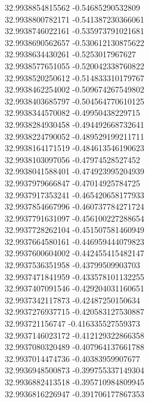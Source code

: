 {32.9938854815562	-0.54685290532809\\
32.9938800782171	-0.541387230366061\\
32.9938746022161	-0.535973791021681\\
32.9938690562657	-0.530612130875622\\
32.9938634430261	-0.5253017967627\\
32.9938577651055	-0.520042338760822\\
32.9938520250612	-0.514833310179767\\
32.9938462254002	-0.509674267549802\\
32.9938403685797	-0.504564770610125\\
32.9938344570082	-0.49950438229715\\
32.9938284930458	-0.494492668732641\\
32.9938224790052	-0.489529199211711\\
32.9938164171519	-0.484613546190623\\
32.9938103097056	-0.47974528527452\\
32.9938041588401	-0.474923995204939\\
32.9937979666847	-0.47014925784725\\
32.9937917353241	-0.465420658177933\\
32.9937854667996	-0.460737784271724\\
32.9937791631097	-0.456100227288654\\
32.9937728262104	-0.451507581460949\\
32.9937664580161	-0.446959444079823\\
32.9937600604002	-0.442455415482147\\
32.9937536351958	-0.43799509903703\\
32.9937471841959	-0.433578101132255\\
32.9937407091546	-0.429204031160651\\
32.9937342117873	-0.42487250150634\\
32.9937276937715	-0.420583127530887\\
32.993721156747	-0.416335527559373\\
32.9937146023172	-0.412129322866358\\
32.9937080320489	-0.407964137661788\\
32.9937014474736	-0.40383959907677\\
32.9936948500873	-0.399755337149304\\
32.9936882413518	-0.395710984809945\\
32.9936816226947	-0.391706177867353\\
}
